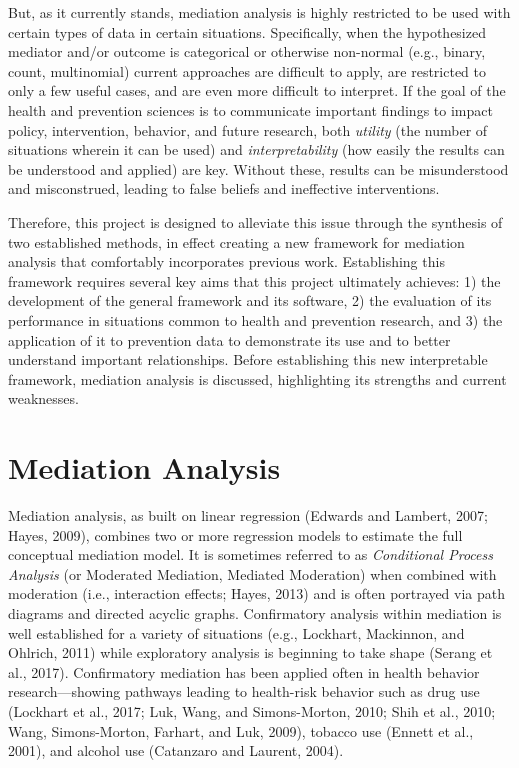 \documentclass[]{DissertateUSU}
\begin{document}
But, as it currently stands, mediation analysis is highly restricted to
be used with certain types of data in certain situations. Specifically,
when the hypothesized mediator and/or outcome is categorical or
otherwise non-normal (e.g., binary, count, multinomial) current
approaches are difficult to apply, are restricted to only a few useful
cases, and are even more difficult to interpret. If the goal of the
health and prevention sciences is to communicate important findings to
impact policy, intervention, behavior, and future research, both
\emph{utility} (the number of situations wherein it can be used) and
\emph{interpretability} (how easily the results can be understood and
applied) are key. Without these, results can be misunderstood and
misconstrued, leading to false beliefs and ineffective interventions.

Therefore, this project is designed to alleviate this issue through the
synthesis of two established methods, in effect creating a new framework
for mediation analysis that comfortably incorporates previous work.
Establishing this framework requires several key aims that this project
ultimately achieves: 1) the development of the general framework and its
software, 2) the evaluation of its performance in situations common to
health and prevention research, and 3) the application of it to
prevention data to demonstrate its use and to better understand
important relationships. Before establishing this new interpretable
framework, mediation analysis is discussed, highlighting its strengths
and current weaknesses.

\section{Mediation Analysis}\label{mediation-analysis}

Mediation analysis, as built on linear regression (Edwards and Lambert,
2007; Hayes, 2009), combines two or more regression models to estimate
the full conceptual mediation model. It is sometimes referred to as
\emph{Conditional Process Analysis} (or Moderated Mediation, Mediated
Moderation) when combined with moderation (i.e., interaction effects;
Hayes, 2013) and is often portrayed via path diagrams and directed
acyclic graphs. Confirmatory analysis within mediation is well
established for a variety of situations (e.g., Lockhart, Mackinnon, and
Ohlrich, 2011) while exploratory analysis is beginning to take shape
(Serang et al., 2017). Confirmatory mediation has been applied often in
health behavior research---showing pathways leading to health-risk
behavior such as drug use (Lockhart et al., 2017; Luk, Wang, and
Simons-Morton, 2010; Shih et al., 2010; Wang, Simons-Morton, Farhart,
and Luk, 2009), tobacco use (Ennett et al., 2001), and alcohol use
(Catanzaro and Laurent, 2004).
\end{document}
